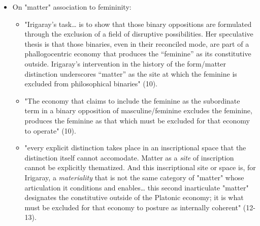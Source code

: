 \documentclass[11pt]{article}
\begin{document}
\begin{itemize}
that Plato appears to claim for himself. Her miming has the effect
of repeating the origin only to displace that origin as an origin"
(18).
\item On "matter" association to femininity:
\begin{itemize}
\item "Irigaray’s task\ldots{} is to show that those binary oppositions are
formulated through the exclusion of a field of disruptive
possibilities. Her speculative thesis is that those binaries, even
in their reconciled mode, are part of a phallogocentric economy
that produces the “feminine” as its constitutive outside.
Irigaray’s intervention in the history of the form/matter
distinction underscores “matter” as the site at which the feminine
is excluded from philosophical binaries" (10).
\item "The economy that claims to include the feminine as the
subordinate term in a binary opposition of masculine/feminine
excludes the feminine, produces the feminine as that which must be
excluded for that economy to operate" (10).
\item "every explicit distinction takes place in an inscriptional space
that the distinction itself cannot accomodate. Matter as a \emph{site}
of inscription cannot be explicitly thematized. And this
inscriptional site or space is, for Irigaray, a \emph{materiality} that
is not the same category of "matter" whose articulation it
conditions and enables\ldots{} this second inarticulate "matter"
designates the constitutive outside of the Platonic economy; it is
what must be excluded for that economy to posture as internally
coherent" (12-13).
\end{itemize}


\end{itemize}
\end{document}

